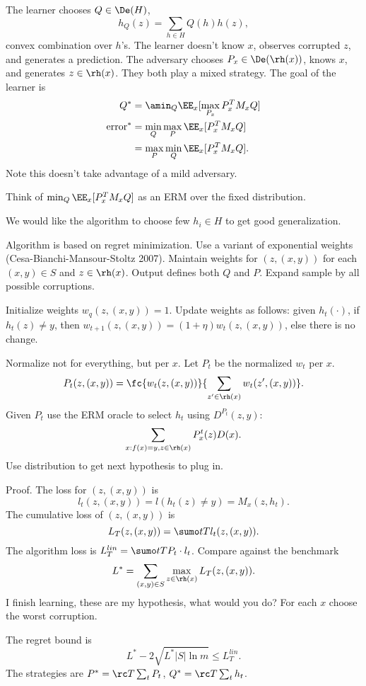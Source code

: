 The learner chooses $Q\in \De(H)$, 
$$
h_Q(z)=\sum_{h\in H} Q(h) h(z),
$$
convex combination over $h$'s. The learner doesn't know $x$, observes corrupted $z$, and generates a prediction. The adversary chooses $P_x\in \De(\rh(x))$, knows $x$, and generates $z\in \rh(x)$.
They both play a mixed strategy.
The goal of the learner is
\begin{align}
Q^* &=\amin_Q \EE_x[\max_{P_x} P_x^T M_xQ]\\
\text{error}^* &= \min_Q\max_P \EE_x[P_x^T M_xQ]\\
&=\max_P\min_Q \EE_x[P_x^TM_xQ].
\end{align}
Note this doesn't take advantage of a mild adversary.

Think of $\min_Q \EE_x[P_x^TM_xQ]$ as an ERM over the fixed distribution. %

We would like the algorithm to choose few $h_i\in H$  to get good generalization.

Algorithm is based on regret minimization. Use a variant of exponential weights (Cesa-Bianchi-Mansour-Stoltz 2007). Maintain weights for $(z,(x,y))$ for each $(x,y)\in S$ and $z\in \rh(x)$. Output defines both $Q$ and $P$. Expand sample by all possible corruptions.

Initialize weights $w_q(z,(x,y))=1$. Update weights as follows: 
given $h_t(\cdot)$,
if $h_t(z)\ne y$, then $w_{t+1}(z,(x,y)) = (1+\eta) w_t(z,(x,y))$, else there is no change. 

Normalize not for everything, but per $x$. Let $P_t$ be the normalized $w_t$ per $x$.
$$
P_t(z,(x,y)) = \fc{w_t(z,(x,y))}{\sum_{z'\in \rh(x)} w_t(z',(x,y))}.
$$
Given $P_t$ use the ERM oracle to select $h_t$ using $D^{P_t}(z,y)$:
$$
\sum_{x:f(x)=y,z\in \rh(x)} P_x^t(z)D(x).
$$
Use distribution to get next hypothesis to plug in.

Proof. 
The loss for $(z,(x,y))$ is 
$$
l_t(z,(x,y)) = l(h_t(z)\ne y) = M_x(z,h_t).
$$
The cumulative loss of $(z,(x,y))$ is
$$
L_T(z,(x,y)) = \sumo tT l_t(z,(x,y)).
$$
The algorithm loss is $L_T^{lin} = \sumo tT P_t\cdot l_t$. Compare against the benchmark
$$
L^* = \sum_{(x,y)\in S} \max_{z\in \rh(x)}L_T(z,(x,y)).
$$
I finish learning, these are my hypothesis, what would you do? For each $x$ choose the worst corruption.

The regret bound is
$$
L^* - 2\sqrt{L^*|S|\ln m}\le L_T^{lin}.
$$
The strategies are $P^* = \rc T\sum_t P_t$, $Q^*=\rc T \sum_t h_t$. 

